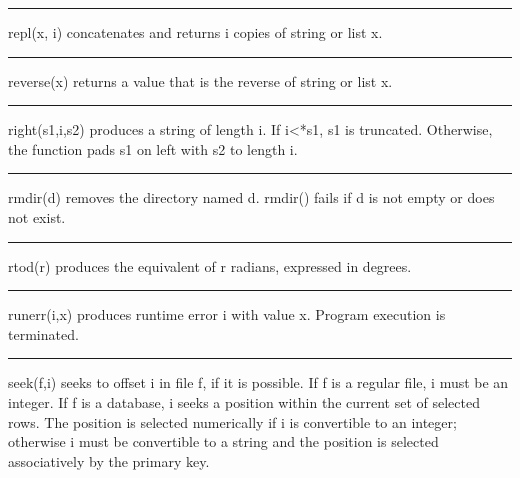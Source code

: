 \bigskip\hrule\vspace{0.1cm}

\noindent
{}\textsf{repl(x, i)} concatenates and returns
\textsf{i} copies of string or list \textsf{x}.

\bigskip\hrule\vspace{0.1cm}

\noindent
{}\textsf{reverse(x)} returns a value that is the
reverse of string or list \textsf{x}.

\bigskip\hrule\vspace{0.1cm}

\noindent
{}\textsf{right(s1,i,s2)} produces a string of length
\textsf{i}. If \textsf{i{\textless}*s1}, \textsf{s1} is truncated.
Otherwise, the function pads \textsf{s1} on left with \textsf{s2} to
length \textsf{i}.

\bigskip\hrule\vspace{0.1cm}

\noindent
{}\textsf{rmdir(d)} removes the directory named
\textsf{d}. \textsf{rmdir()} fails if \textsf{d} is not empty or does
not exist.

\bigskip\hrule\vspace{0.1cm}

\noindent
{}\textsf{rtod(r)} produces the
equivalent of \textsf{r} radians, expressed in degrees.

\bigskip\hrule\vspace{0.1cm}

\noindent
{}\textsf{runerr(i,x)} produces runtime error
\textsf{i} with value \textsf{x}. Program execution is terminated.

\bigskip\hrule\vspace{0.1cm}

\noindent
{}\textsf{seek(f,i)} seeks to offset \textsf{i} in file
\textsf{f}, if it is possible. If \textsf{f} is a regular file,
\textsf{i} must be an integer. If \textsf{f} is a database, \textsf{i}
seeks a position within the current set of selected rows. The position
is selected numerically if \textsf{i} is convertible to an integer;
otherwise \textsf{i} must be convertible to a string and the position
is selected associatively by the primary key.

